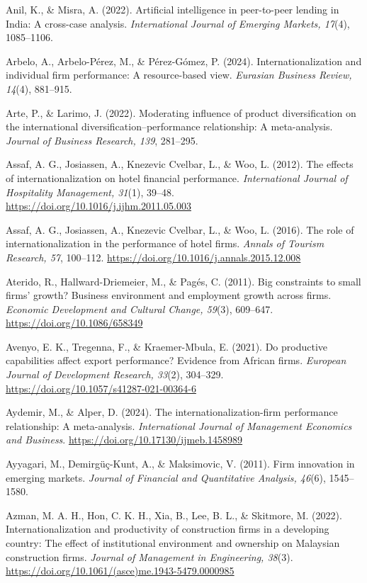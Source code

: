 \documentclass[
  a4paper,
  13pt]{extreport}
\begin{document}
Anil, K., \& Misra, A. (2022). Artificial intelligence in peer-to-peer
lending in India: A cross-case analysis. \emph{International Journal of
Emerging Markets, 17}(4), 1085--1106.

Arbelo, A., Arbelo-Pérez, M., \& Pérez-Gómez, P. (2024).
Internationalization and individual firm performance: A resource-based
view. \emph{Eurasian Business Review, 14}(4), 881--915.

Arte, P., \& Larimo, J. (2022). Moderating influence of product
diversification on the international diversification--performance
relationship: A meta-analysis. \emph{Journal of Business Research, 139},
281--295.

Assaf, A. G., Josiassen, A., Knezevic Cvelbar, L., \& Woo, L. (2012).
The effects of internationalization on hotel financial performance.
\emph{International Journal of Hospitality Management, 31}(1), 39--48.
\url{https://doi.org/10.1016/j.ijhm.2011.05.003}

Assaf, A. G., Josiassen, A., Knezevic Cvelbar, L., \& Woo, L. (2016).
The role of internationalization in the performance of hotel firms.
\emph{Annals of Tourism Research, 57}, 100--112.
\url{https://doi.org/10.1016/j.annals.2015.12.008}

Aterido, R., Hallward-Driemeier, M., \& Pagés, C. (2011). Big
constraints to small firms' growth? Business environment and employment
growth across firms. \emph{Economic Development and Cultural Change,
59}(3), 609--647. \url{https://doi.org/10.1086/658349}

Avenyo, E. K., Tregenna, F., \& Kraemer-Mbula, E. (2021). Do productive
capabilities affect export performance? Evidence from African firms.
\emph{European Journal of Development Research, 33}(2), 304--329.
\url{https://doi.org/10.1057/s41287-021-00364-6}

Aydemir, M., \& Alper, D. (2024). The internationalization-firm
performance relationship: A meta-analysis. \emph{International Journal
of Management Economics and Business}.
\url{https://doi.org/10.17130/ijmeb.1458989}

Ayyagari, M., Demirgüç-Kunt, A., \& Maksimovic, V. (2011). Firm
innovation in emerging markets. \emph{Journal of Financial and
Quantitative Analysis, 46}(6), 1545--1580.

Azman, M. A. H., Hon, C. K. H., Xia, B., Lee, B. L., \& Skitmore, M.
(2022). Internationalization and productivity of construction firms in a
developing country: The effect of institutional environment and
ownership on Malaysian construction firms. \emph{Journal of Management
in Engineering, 38}(3).
\url{https://doi.org/10.1061/(asce)me.1943-5479.0000985}
\end{document}
